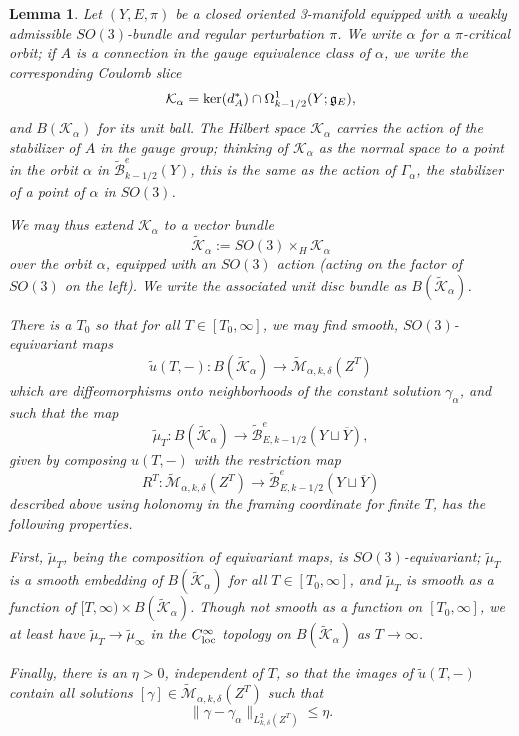 \documentclass[10pt,a4paper]{amsart}
\newtheorem{lemma}[theorem]{Lemma}
\theoremstyle{definition}
\theoremstyle{remark}
\numberwithin{figure}{qchap}
\begin{document}
\begin{lemma}\label{maingluinglemma}Let $(Y,E,\pi)$ be a closed oriented 3-manifold equipped with a weakly admissible $SO(3)$-bundle and regular perturbation $\pi$. We write $\alpha$ for a $\pi$-critical orbit; if $A$ is a connection in the gauge equivalence class of $\alpha$, we write the corresponding Coulomb slice 
$$\mathcal K_\alpha = \textup{ker}(d^*_A) \cap \Omega^1_{k-1/2}(Y;\mathfrak g_E),$$ 
and $B(\mathcal K_\alpha)$ for its unit ball. The Hilbert space $\mathcal K_\alpha$ carries the action of the stabilizer of $A$ in the gauge group; thinking of $\mathcal K_\alpha$ as the normal space to a point in the orbit $\alpha$ in $\widetilde{\mathcal B}^e_{k-1/2}(Y)$, this is the same as the action of $\Gamma_\alpha$, the stabilizer of a point of $\alpha$ in $SO(3)$.

We may thus extend $\mathcal K_\alpha$ to a vector bundle 
$$\widetilde{\mathcal K}_\alpha := SO(3) \times_H \mathcal K_\alpha$$ 
over the orbit $\alpha$, equipped with an $SO(3)$ action (acting on the factor of $SO(3)$ on the left). We write the associated unit disc bundle as $B(\widetilde{\mathcal K}_\alpha)$.

There is a $T_0$ so that for all $T \in [T_0, \infty]$, we may find smooth, $SO(3)$-equivariant maps $$\widetilde u(T, -): B(\widetilde{\mathcal K}_\alpha) \to \widetilde{\mathcal M}_{\alpha, k,\delta}(Z^T)$$ which are diffeomorphisms onto neighborhoods of the constant solution $\gamma_\alpha$, and such that the map $$\widetilde{\mu}_T: B(\widetilde{\mathcal K}_\alpha) \to \widetilde{\mathcal B}^e_{E,k-1/2}(Y \sqcup \overline Y),$$ given by composing $u(T, -)$ with the restriction map $$R^T: \widetilde{\mathcal M}_{\alpha, k,\delta}(Z^T) \to \widetilde{\mathcal B}^e_{E,k-1/2}(Y \sqcup \overline Y)$$ described above using holonomy in the framing coordinate for finite $T$, has the following properties.

First, $\widetilde{\mu}_T$, being the composition of equivariant maps, is $SO(3)$-equivariant; $\widetilde{\mu}_T$ is a smooth embedding of $B(\widetilde{\mathcal K}_\alpha)$ for all $T \in [T_0, \infty]$, and $\widetilde{\mu}_T$ is smooth as a function of $[T, \infty) \times B(\widetilde{\mathcal K}_\alpha)$. Though not smooth as a function on $[T_0, \infty]$, we at least have $\widetilde{\mu}_T \to \widetilde{\mu}_\infty$ in the $C^\infty_{\textup{loc}}$ topology on $B(\widetilde{\mathcal K}_\alpha)$ as $T \to \infty$.

Finally, there is an $\eta > 0$, independent of $T$, so that the images of $\widetilde u(T, -)$ contain all solutions $[\gamma] \in \widetilde{\mathcal M}_{\alpha, k, \delta}(Z^T)$ such that $$\|\gamma - \gamma_\alpha\|_{L^2_{k,\delta}(Z^T)} \leq \eta.$$


\end{lemma}
\end{document}
